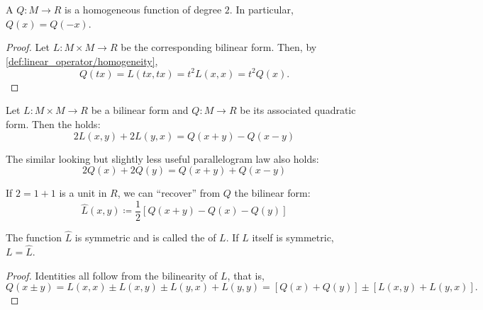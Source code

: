 \begin{proposition}\label{thm:bilinear_forms_vs_to_quadratic_forms}
  A  \( Q: M \to R \) is a homogeneous function of degree \( 2 \). In particular, \( Q(x) = Q(-x) \).
\end{proposition}
\begin{proof}
  Let \( L: M \times M \to R \) be the corresponding bilinear form. Then, by \ref{def:linear_operator/homogeneity},
  \begin{equation*}
    Q(tx) = L(tx, tx) = t^2 L(x, x) = t^2 Q(x).
  \end{equation*}
\end{proof}

\begin{proposition}\label{thm:polarization_identity}\cite{nLab:polarization_identity}
  Let \( L: M \times M \to R \) be a bilinear form and \( Q: M \to R \) be its associated quadratic form. Then the  holds:
  \begin{equation}\label{thm:polarization_identity/polarization_identity}
    2 L(x, y) + 2 L(y, x) = Q(x + y) - Q(x - y)
  \end{equation}

  The similar looking but slightly less useful parallelogram law also holds:
  \begin{equation}\label{thm:polarization_identity/parallelogram_law}
    2 Q(x) + 2 Q(y) = Q(x + y) + Q(x - y)
  \end{equation}

  If \( 2 = 1 + 1 \) is a unit in \( R \), we can \enquote{recover} from \( Q \) the bilinear form:
  \begin{equation}\label{thm:polarization_identity/symmetrization_definition}
    \hat L(x, y) \coloneqq \frac 1 2 \left[ Q(x + y) - Q(x) - Q(y) \right]
  \end{equation}

  The function \( \hat L \) is symmetric and is called the  of \( L \). If \( L \) itself is symmetric, \( L = \hat L \).
\end{proposition}
\begin{proof}
  Identities  all follow from the bilinearity of \( L \), that is,
  \begin{equation*}
    Q(x \pm y)
    =
    L(x, x) \pm L(x, y) \pm L(y, x) + L(y, y)
    =
    [Q(x) + Q(y)] \pm [L(x, y) + L(y, x)].
  \end{equation*}
\end{proof}


